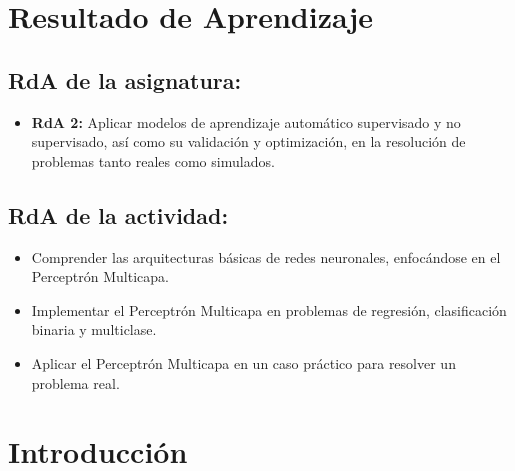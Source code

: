 \documentclass[a4,11pt]{aleph-notas}
\begin{document}
\encabezado


\section*{Resultado de Aprendizaje}

\subsection*{RdA de la asignatura:}
\begin{itemize}[leftmargin=*]
    \item \textbf{RdA 2:} 
    Aplicar modelos de aprendizaje automático supervisado y no supervisado, así como su validación y optimización, en la resolución de problemas tanto reales como simulados.
\end{itemize}

\subsection*{RdA de la actividad:}
\begin{itemize}[leftmargin=*]
    \item Comprender las arquitecturas básicas de redes neuronales, enfocándose en el Perceptrón Multicapa.
    \item Implementar el Perceptrón Multicapa en problemas de regresión, clasificación binaria y multiclase.
    \item Aplicar el Perceptrón Multicapa en un caso práctico para resolver un problema real.
\end{itemize}

\section*{Introducción}
\end{document}
